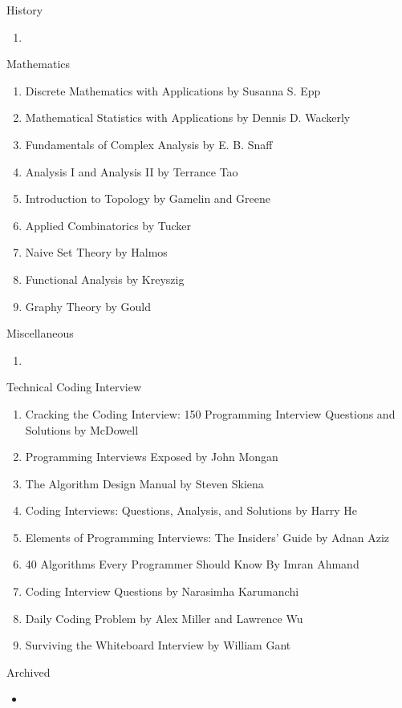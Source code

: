 \documentclass{article}
\begin{document}
\hrulefill

\LARGE History

\normalsize
    \begin{enumerate}
        \item 
    \end{enumerate}

\hrulefill

\LARGE Mathematics

\normalsize
    \begin{enumerate}
        \item Discrete Mathematics with Applications by Susanna S. Epp
        \item Mathematical Statistics with Applications by Dennis D. Wackerly
        \item Fundamentals of Complex Analysis by E. B. Snaff
        \item Analysis I and Analysis II by Terrance Tao
        \item Introduction to Topology by Gamelin and Greene
        \item Applied Combinatorics by Tucker
        \item Naive Set Theory by Halmos
        \item Functional Analysis by Kreyszig
        \item Graphy Theory by Gould
    \end{enumerate}

\hrulefill

\LARGE Miscellaneous

\normalsize
    \begin{enumerate}
        \item  
    \end{enumerate}

\hrulefill

\LARGE Technical Coding Interview
\normalsize
    \begin{enumerate}
        \item Cracking the Coding Interview: 150 Programming Interview Questions and Solutions by McDowell
        \item Programming Interviews Exposed by John Mongan
        \item The Algorithm Design Manual by Steven Skiena
        \item Coding Interviews: Questions, Analysis, and Solutions by Harry He
        \item Elements of Programming Interviews: The Insiders' Guide by Adnan Aziz
        \item 40 Algorithms Every Programmer Should Know By Imran Ahmand
        \item Coding Interview Questions by Narasimha Karumanchi
        \item Daily Coding Problem by Alex Miller and Lawrence Wu
        \item Surviving the Whiteboard Interview by William Gant
    \end{enumerate}

\hrulefill

\LARGE Archived

\normalsize
    \begin{itemize}
        \item 
    \end{itemize}

    
\end{document}

